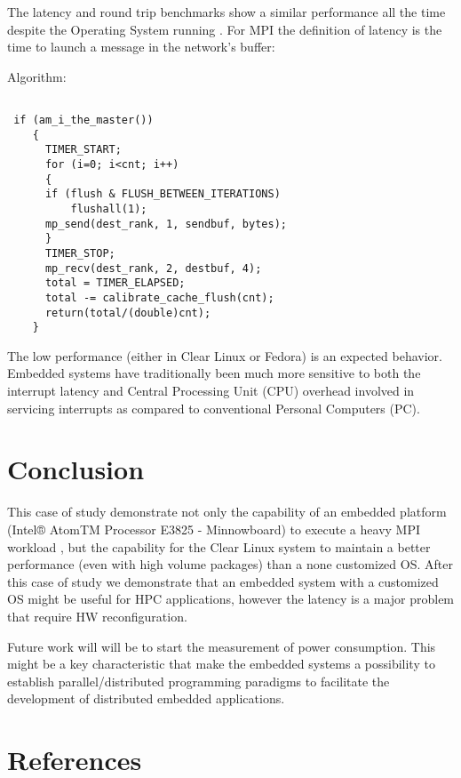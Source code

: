 \documentclass[a4paper]{article}
\begin{document}
The latency and round trip benchmarks show a similar performance all the time
despite the Operating System running . For MPI the definition of latency is 
the time to launch a message in the network's buffer: 

Algorithm: 

\begin{lstlisting}

 if (am_i_the_master())
    {
      TIMER_START;
      for (i=0; i<cnt; i++)
      {
      if (flush & FLUSH_BETWEEN_ITERATIONS)
          flushall(1);
      mp_send(dest_rank, 1, sendbuf, bytes);
      }
      TIMER_STOP;
      mp_recv(dest_rank, 2, destbuf, 4);
      total = TIMER_ELAPSED;
      total -= calibrate_cache_flush(cnt);
      return(total/(double)cnt);   
    }

\end{lstlisting}

The low performance (either in Clear Linux or Fedora) is an expected behavior. 
Embedded systems have traditionally been much more sensitive to both the 
interrupt latency and Central Processing Unit (CPU) overhead involved in 
servicing interrupts as compared to conventional Personal Computers (PC).


\section{Conclusion}

This case of study demonstrate not only the capability of an embedded platform
(Intel® AtomTM Processor E3825 - Minnowboard) to execute a heavy  MPI workload ,
but the capability for the Clear Linux  system to maintain a better performance 
(even with high volume packages) than a none customized OS. After this case of 
study we demonstrate that an embedded system with a customized OS might be 
useful for HPC applications, however the latency is a major problem that 
require HW reconfiguration. 

Future work will will be to start the measurement of power consumption. This
might be a key characteristic that make the embedded systems a possibility to
establish  parallel/distributed programming paradigms to facilitate the
development of distributed embedded applications. 

\section{References}
\end{document}

